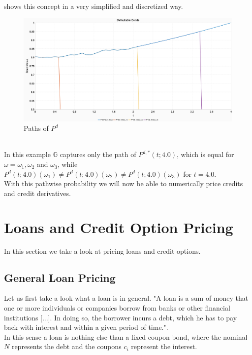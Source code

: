 \documentclass[12pt]{article}
\begin{document}
	 shows this concept in a very simplified and discretized way.
	\begin{figure}[h]
		\centering
		\includegraphics[width=\linewidth]{SurvivalProbability}
		\caption{Paths of $P^d$}
		\label{fig:survivalprobabilityvisualisation}
	\end{figure}
	\\In this example $\mathbb{G}$ captures only the path of $P^{d,*}(t; 4.0)$, which is equal for $\omega = \omega_1, \omega_2$ and $\omega_3$, while $P^d(t; 4.0)(\omega_1) \ne P^d(t; 4.0)(\omega_2) \ne P^d(t; 4.0)(\omega_3)$ for $t = 4.0$.\\
	With this pathwise probability we will now be able to numerically price credits and credit derivatives.
	
	
	
	
	
	\pagebreak
	\section{Loans and Credit Option Pricing}
	In this section we take a look at pricing loans and credit options.
	\subsection{General Loan Pricing}
	Let us first take a look what a loan is in general. "A loan is a sum of money that one or more individuals or companies borrow from banks or other financial institutions [...]. In doing so, the borrower incurs a debt, which he has to pay back with interest and within a given period of time."\cite{corpFinInst}.\\
	In this sense a loan is nothing else than a fixed coupon bond, where the nominal $N$ represents the debt and the coupons $c_i$ represent the interest.
	
\end{document}
